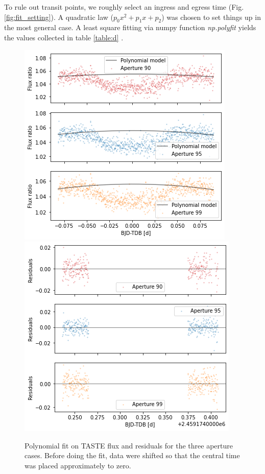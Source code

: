 \documentclass{aa}
\begin{document}
To rule out transit points, we roughly select an ingress and egress time (Fig.\ref{fig:fit_setting}). A quadratic law ($p_0 x^2 + p_1 x +p_2$) was chosen to set things up in the most general case. A least square fitting via numpy function \textit{np.polyfit} yields the values collected in table \ref{table:d} .
\begin{figure}[h]
    \centering  
    \includegraphics[scale=0.45, angle=0]{pictures/fit2.png}
    \includegraphics[scale=0.45, angle=0]{pictures/residuals2.png}
    \caption{Polynomial fit on TASTE flux and residuals for the three aperture cases. Before doing the fit, data were shifted so that the central time was placed approximately to zero.}
    \label{fig:fit2}
\end{figure}
\end{document}
